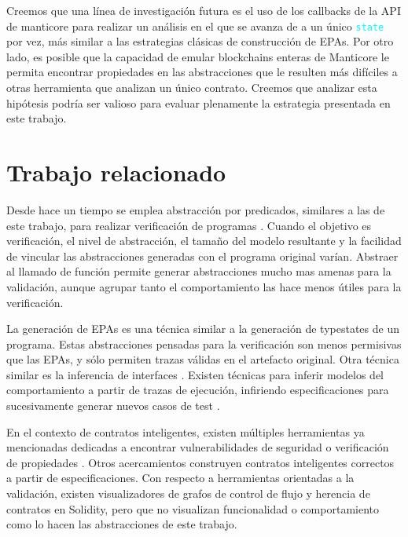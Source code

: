 Creemos que una línea de investigación futura es el uso de los callbacks de la API de manticore para realizar un análisis en el que se avanza de a un único \textcolor{cyan}{\texttt{state}} por vez, más similar a las estrategias clásicas de construcción de EPAs.
Por otro lado, es posible que la capacidad de emular blockchains enteras de Manticore le permita encontrar propiedades en las abstracciones que le resulten más difíciles a otras herramienta que analizan un único contrato.
Creemos que analizar esta hipótesis podría ser valioso para evaluar plenamente la estrategia presentada en este trabajo.

\section{Trabajo relacionado}
Desde hace un tiempo se emplea abstracción por predicados, similares a las de este trabajo, para realizar verificación de programas \cite{predicate-abstraction-for-verification}.
Cuando el objetivo es verificación, el nivel de abstracción, el tamaño del modelo resultante y la facilidad de vincular las abstracciones generadas con el programa original varían.
Abstraer al llamado de función permite generar abstracciones mucho mas amenas para la validación, aunque agrupar tanto el comportamiento las hace menos útiles para la verificación.

La generación de EPAs es una técnica similar a la generación de typestates \cite{high-level-protocols-for-low-level-software} de un programa.
Estas abstracciones pensadas para la verificación son menos permisivas que las EPAs, y sólo permiten trazas válidas en el artefacto original.
Otra técnica similar es la inferencia de interfaces \cite{permissive-interfaces}.
Existen técnicas para inferir modelos del comportamiento a partir de trazas de ejecución, infiriendo especificaciones para sucesivamente generar nuevos casos de test \cite{inference-by-traces}.

En el contexto de contratos inteligentes, existen múltiples herramientas ya mencionadas dedicadas a encontrar vulnerabilidades de seguridad \cite{oyente} \cite{echidna} \cite{manticore} \cite{pakala} \cite{teether} o verificación de propiedades \cite{solidity-to-CPN} \cite{formal-analysis-based-on-CPN} \cite{verisol}.
Otros acercamientos \cite{VeriSolid} construyen contratos inteligentes correctos a partir de especificaciones.
Con respecto a herramientas orientadas a la validación, existen visualizadores \cite{surya} \cite{slither} de grafos de control de flujo y herencia de contratos en Solidity, pero que no visualizan funcionalidad o comportamiento como lo hacen las abstracciones de este trabajo.

